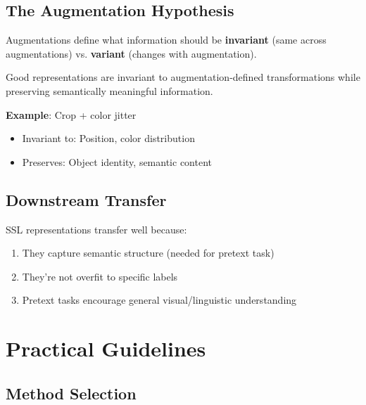 \subsection{The Augmentation Hypothesis}

\begin{keyinsight}
Augmentations define what information should be \textbf{invariant} (same across augmentations) vs. \textbf{variant} (changes with augmentation).

Good representations are invariant to augmentation-defined transformations while preserving semantically meaningful information.
\end{keyinsight}

\textbf{Example}: Crop + color jitter
\begin{itemize}
    \item Invariant to: Position, color distribution
    \item Preserves: Object identity, semantic content
\end{itemize}

\subsection{Downstream Transfer}

SSL representations transfer well because:
\begin{enumerate}
    \item They capture semantic structure (needed for pretext task)
    \item They're not overfit to specific labels
    \item Pretext tasks encourage general visual/linguistic understanding
\end{enumerate}

\section{Practical Guidelines}
\label{sec:ssl_practical}

\subsection{Method Selection}

